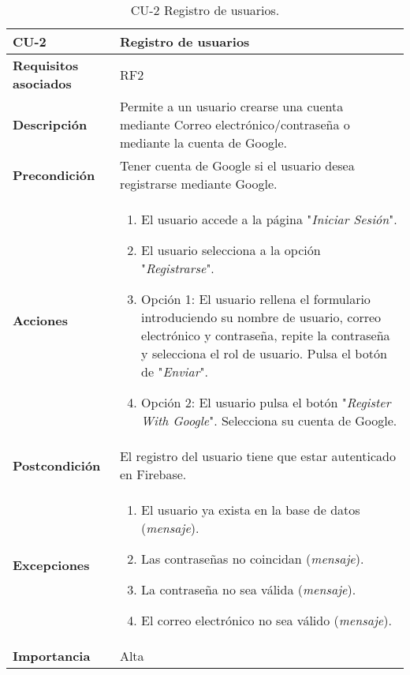 \begin{table}[p]
	\centering
	\begin{tabularx}{\linewidth}{ p{} p{} }
		\toprule
		\textbf{CU-2}    & \textbf{Registro de usuarios}\\
		\toprule
		\textbf{Requisitos asociados} & RF2 \\
		\textbf{Descripción}          & Permite a un usuario crearse una cuenta mediante Correo electrónico/contraseña o mediante la cuenta de Google. \\
		\textbf{Precondición}         & Tener cuenta de Google si el usuario desea registrarse mediante Google. \\
		\textbf{Acciones}             &
		\begin{enumerate}
			\def\labelenumi{\arabic{enumi}.}
			\tightlist
			\item El usuario accede a la página "\textit{Iniciar Sesión}".
			\item El usuario selecciona a la opción "\textit{Registrarse}".
			\item Opción 1: El usuario rellena el formulario introduciendo su nombre de usuario, correo electrónico y contraseña, repite la contraseña y selecciona el rol de usuario.
			Pulsa el botón de "\textit{Enviar}".
			\item Opción 2: El usuario pulsa el botón "\textit{Register With Google}".
			Selecciona su cuenta de Google.
		\end{enumerate}\\
		\textbf{Postcondición}        &  El registro del usuario tiene que estar autenticado en Firebase. \\
		\textbf{Excepciones}          & 
		\begin{enumerate}
			\def\labelenumi{\arabic{enumi}.}
			\tightlist
			\item El usuario ya exista en la base de datos (\textit{mensaje}).
                \item Las contraseñas no coincidan (\textit{mensaje}).
			\item La contraseña no sea válida (\textit{mensaje}).
			\item El correo electrónico no sea válido (\textit{mensaje}).
            \end{enumerate}\\
		\textbf{Importancia}          & Alta \\
		\bottomrule
	\end{tabularx}
	\caption{CU-2 Registro de usuarios.}
\end{table}

